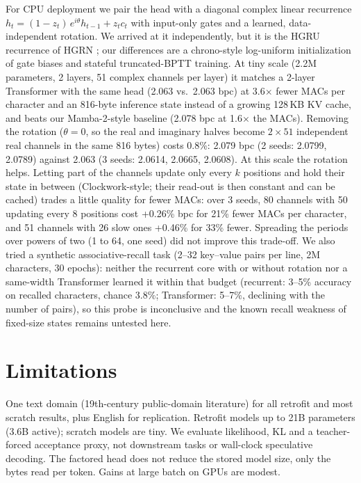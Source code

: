 \documentclass[11pt]{article}
\begin{document}
For CPU deployment we pair the head with a diagonal complex linear recurrence $h_t=(1-z_t)\,e^{i\theta}h_{t-1}+z_t c_t$ with input-only gates and a learned, data-independent rotation. We arrived at it independently, but it is the HGRU recurrence of HGRN \citep{qin2023hgrn}; our differences are a chrono-style log-uniform initialization of gate biases and stateful truncated-BPTT training. At tiny scale (2.2M parameters, 2 layers, 51 complex channels per layer) it matches a 2-layer Transformer with the same head (2.063 vs.\ 2.063 bpc) at 3.6$\times$ fewer MACs per character and an 816-byte inference state instead of a growing 128\,KB KV cache, and beats our Mamba-2-style baseline (2.078 bpc at 1.6$\times$ the MACs). Removing the rotation ($\theta=0$, so the real and imaginary halves become $2\times51$ independent real channels in the same 816 bytes) costs 0.8\%: 2.079 bpc (2 seeds: 2.0799, 2.0789) against 2.063 (3 seeds: 2.0614, 2.0665, 2.0608). At this scale the rotation helps. Letting part of the channels update only every $k$ positions and hold their state in between (Clockwork-style; their read-out is then constant and can be cached) trades a little quality for fewer MACs: over 3 seeds, 80 channels with 50 updating every 8 positions cost +0.26\% bpc for 21\% fewer MACs per character, and 51 channels with 26 slow ones +0.46\% for 33\% fewer. Spreading the periods over powers of two (1 to 64, one seed) did not improve this trade-off. We also tried a synthetic associative-recall task (2--32 key--value pairs per line, 2M characters, 30 epochs): neither the recurrent core with or without rotation nor a same-width Transformer learned it within that budget (recurrent: 3--5\% accuracy on recalled characters, chance 3.8\%; Transformer: 5--7\%, declining with the number of pairs), so this probe is inconclusive and the known recall weakness of fixed-size states \citep{arora2023zoology,jelassi2024repeat} remains untested here.

\section{Limitations}

One text domain (19th-century public-domain literature) for all retrofit and most scratch results, plus English for replication. Retrofit models up to 21B parameters (3.6B active); scratch models are tiny. We evaluate likelihood, KL and a teacher-forced acceptance proxy, not downstream tasks or wall-clock speculative decoding. The factored head does not reduce the stored model size, only the bytes read per token. Gains at large batch on GPUs are modest.
\end{document}
